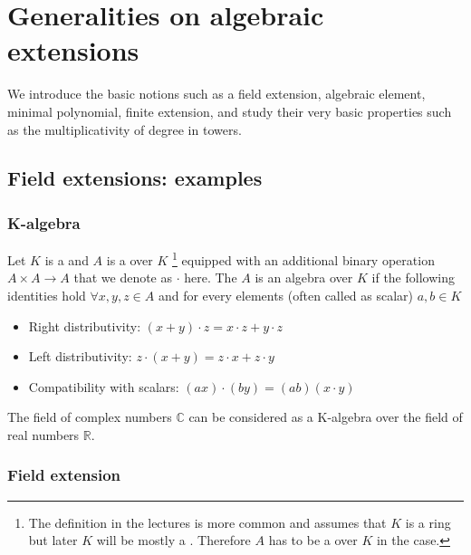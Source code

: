 \chapter{Generalities on algebraic extensions}
We introduce the basic notions such as a field extension, algebraic
element, minimal polynomial, finite extension, and study their very
basic properties such as the multiplicativity of degree in towers. 

\section{Field extensions: examples}

\subsection{K-algebra}
\begin{definition}[K-algebra]
  \label{def:kalgebra}
  Let $K$ is a  and $A$ is a
   over $K$ 
  \footnote{
    The definition in the lectures is more common and assumes that $K$
    is a ring but later $K$ will be mostly a . Therefore
    $A$ has to be a  over $K$ in the case. 
  }
  equipped with 
  an additional binary operation $A \times A \rightarrow A$ that we
  denote as $\cdot$ here. The $A$ is an algebra over $K$ if the
  following identities hold $\forall x,y,z \in A$ and for every
  elements (often called as scalar) $a, b \in K$
  \begin{itemize}
  \item Right distributivity:
    $(x + y) \cdot z = x \cdot z + y \cdot z$
  \item Left distributivity:
    $z \cdot (x + y) = z \cdot x + z \cdot y$
  \item Compatibility with scalars:
    $(ax) \cdot (by) = (ab) (x \cdot y)$
  \end{itemize}
\end{definition}

\begin{example}
  The field of complex numbers $\mathbb{C}$ can be considered as a
  K-algebra over the field of real numbers $\mathbb{R}$.
  \label{ex:complexnumbers}
\end{example}

\subsection{Field extension}

